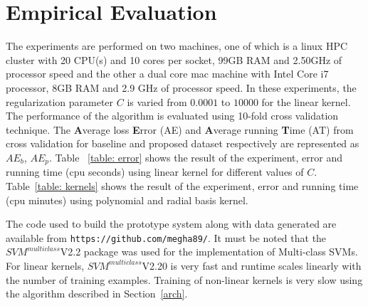 \documentclass[10pt, conference, compsocconf]{IEEEtran}
\begin{document}
\section{Empirical Evaluation}
\label{sec:evaluation}

The experiments are performed on two machines, one of which is a linux HPC cluster with 20 CPU(s) and 10 cores per socket, 99GB RAM and 2.50GHz of processor speed and the other a dual core mac machine with Intel Core i7 processor, 8GB RAM and 2.9 GHz of processor speed. In these experiments, the regularization parameter $C$ is varied from $0.0001$ to $10000$ for the linear kernel. The performance of the algorithm is evaluated using 10-fold cross validation technique. The \textbf{A}verage loss \textbf{E}rror (AE) and  \textbf{A}verage running \textbf{T}ime (AT) from cross validation for baseline and proposed dataset respectively are represented as $AE_{b}$, $AE_{p}$. Table ~\ref{table: error} shows the result of the experiment, error and running time (cpu seconds) using linear kernel for different values of $C$. Table~\ref{table: kernels} shows the result of the experiment, error and running time (cpu minutes) using polynomial and radial basis kernel.
 
The code used to build the prototype system along with data generated are available from \texttt{https://github.com/megha89/}. It must be noted that the $SVM^{multiclass}$V2.2 package \cite{algo} was used for the implementation of Multi-class SVMs. 
For linear kernels, $SVM^{multiclass}$V2.20 is very fast and runtime scales linearly with the number of training examples. Training of non-linear kernels is very slow using the algorithm described in Section~\ref{arch}.
\end{document}
